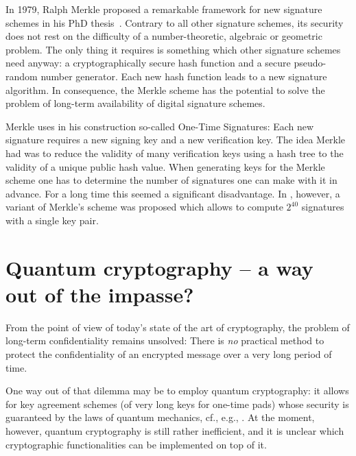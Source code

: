 In 1979, Ralph Merkle proposed a remarkable
framework for new signature schemes in his PhD
thesis~\cite{merkle-thesis:1979}.
Contrary to all other signature schemes, its
security does not rest on the difficulty of a
number-theoretic, algebraic or geometric problem.
The only thing it requires is something which
other signature schemes need anyway: a
cryptographically secure hash function and a
secure pseudo-random number generator.  Each new
hash function leads to a new signature algorithm.
In consequence, the Merkle scheme has the
potential to solve the problem of long-term
availability of digital signature schemes.

Merkle uses in his construction so-called One-Time
Signatures: Each new signature requires a new
signing key and a new verification key.  The idea
Merkle had was to reduce the validity of many
verification keys using a hash tree to the
validity of a unique public hash value.  When
generating keys for the Merkle scheme one has to
determine the number of signatures one can make
with it in advance.  For a long time this seemed a
significant disadvantage.  In
\cite{buchmann/coronado/dahmen/doering/klintsevich:2006},
however, a variant of Merkle's scheme was proposed
which allows to compute $2^{40}$ signatures with a
single key pair.


\section{Quantum cryptography -- a way out of the impasse?}
\label{sec:quantum cryptography}

From the point of view of today's state of the art
of cryptography, the problem of long-term
confidentiality remains unsolved: There is
\emph{no} practical method to protect the
confidentiality of an encrypted message over a
very long period of time.

One way out of that dilemma may be to employ
quantum cryptography: it allows for key agreement
schemes (of very long keys for one-time pads)
whose security is
guaranteed by the laws of quantum mechanics,
cf., e.g., \cite{bennett/brassard:1984b}.  At the
moment, however, quantum cryptography is still
rather inefficient, and it is unclear which
cryptographic functionalities can be implemented
on top of it.


